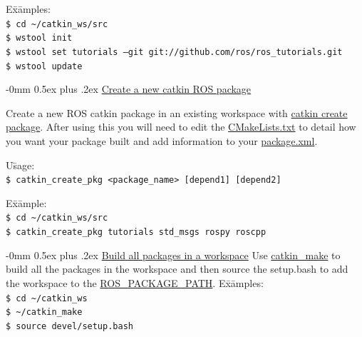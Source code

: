 \documentclass[10pt,landscape]{article}
\makeatletter
\renewcommand{\subsection}{\@startsection{subsection}{2}{0mm}%
                                {-0mm}%
                                {0.5ex plus .2ex}%
                                {\normalfont\normalsize\bfseries}}
\newenvironment{nstabbing}
  {\setlength{\topsep}{1pt}%
   \setlength{\partopsep}{1pt}%
   \tabbing}
  {\endtabbing}
\makeatother
\begin{document}
\begin{multicols}{3}
\begin{nstabbing}
E\=x\=amples:\\
\> \texttt{\$ cd \textasciitilde/catkin\_ws/src}\\
\> \texttt{\$ wstool init}\\
\> \texttt{\$ wstool set tutorials --git git://github.com/ros/ros\_tutorials.git}\\
\> \texttt{\$ wstool update}\\
\end{nstabbing}


\subsection{\href{http://wiki.ros.org/catkin/Tutorials/CreatingPackage}{Create a new catkin ROS package}}

Create a new ROS catkin package in an existing workspace with \href{http://wiki.ros.org/catkin/Tutorials/CreatingPackage}{catkin create package}. After using this you will need to edit the \href{http://wiki.ros.org/catkin/CMakeLists.txt}{CMakeLists.txt} to detail how you want your package built and add information to your \href{http://wiki.ros.org/catkin/package.xml}{package.xml}.

\begin{nstabbing}
U\=sage:\\
\> \texttt{\$ catkin\_create\_pkg <package\_name> [depend1] [depend2]}\\
\end{nstabbing}

\begin{nstabbing}
E\=x\=ample:\\
\> \texttt{\$ cd \textasciitilde/catkin\_ws/src}\\
\> \texttt{\$ catkin\_create\_pkg tutorials std\_msgs rospy roscpp}\\
\end{nstabbing}

\subsection{\href{http://wiki.ros.org/catkin/Tutorials/using_a_workspace}{Build all packages in a workspace}}
Use \href{http://wiki.ros.org/catkin/Tutorials/using\_a\_workspace}{catkin\_make} to build all the packages in the workspace and then source the setup.bash to add the workspace to the \href{http://wiki.ros.org/ROS/EnvironmentVariables#ROS_PACKAGE_PATH}{ROS\_PACKAGE\_PATH}.
\begin{nstabbing}
E\=x\=amples:\\
\> \texttt{\$ cd \textasciitilde/catkin\_ws}\\
\> \texttt{\$ \textasciitilde/catkin\_make}\\
\> \texttt{\$ source devel/setup.bash}\\
\end{nstabbing}


\end{multicols}
\end{document}

